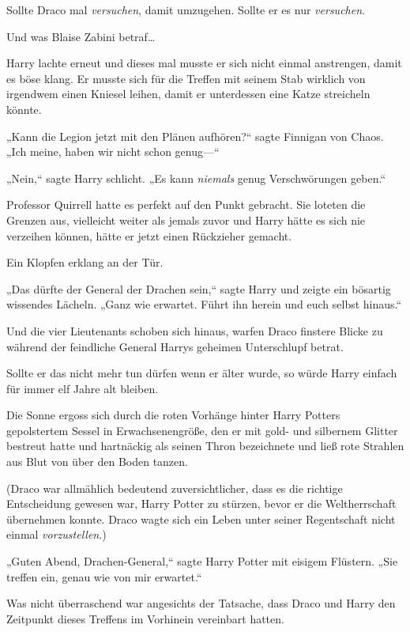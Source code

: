 {Sollte Draco mal \emph{versuchen}, damit umzugehen. Sollte er es nur \emph{versuchen}.

Und was Blaise Zabini betraf…

Harry lachte erneut und dieses mal musste er sich nicht einmal anstrengen, damit es böse klang. Er musste sich für die Treffen mit seinem Stab wirklich von irgendwem einen Kniesel leihen, damit er unterdessen eine Katze streicheln könnte.

„Kann die Legion jetzt mit den Plänen aufhören?“ sagte Finnigan von Chaos. „Ich meine, haben wir nicht schon genug—“

„Nein,“ sagte Harry schlicht. „Es kann \emph{niemals} genug Verschwörungen geben.“

Professor Quirrell hatte es perfekt auf den Punkt gebracht. Sie loteten die Grenzen aus, vielleicht weiter als jemals zuvor und Harry hätte es sich nie verzeihen können, hätte er jetzt einen Rückzieher gemacht.

Ein Klopfen erklang an der Tür.

„Das dürfte der General der Drachen sein,“ sagte Harry und zeigte ein bösartig wissendes Lächeln. „Ganz wie erwartet. Führt ihn herein und euch selbst hinaus.“

Und die vier Lieutenants schoben sich hinaus, warfen Draco finstere Blicke zu während der feindliche General Harrys geheimen Unterschlupf betrat.

Sollte er das nicht mehr tun dürfen wenn er älter wurde, so würde Harry einfach für immer elf Jahre alt bleiben.

\later

Die Sonne ergoss sich durch die roten Vorhänge hinter Harry Potters gepolstertem Sessel in Erwachsenengröße, den er mit gold- und silbernem Glitter bestreut hatte und hartnäckig als seinen Thron bezeichnete und ließ rote Strahlen aus Blut von über den Boden tanzen.

(Draco war allmählich bedeutend zuversichtlicher, dass es die richtige Entscheidung gewesen war, Harry Potter zu stürzen, bevor er die Weltherrschaft übernehmen konnte. Draco wagte sich ein Leben unter seiner Regentschaft nicht einmal \emph{vorzustellen}.)

„Guten Abend, Drachen-General,“ sagte Harry Potter mit eisigem Flüstern. „Sie treffen ein, genau wie von mir erwartet.“

Was nicht überraschend war angesichts der Tatsache, dass Draco und Harry den Zeitpunkt dieses Treffens im Vorhinein vereinbart hatten.

}

